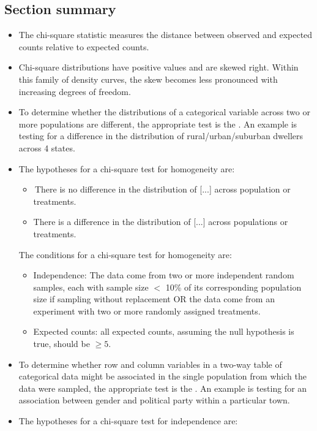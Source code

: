  
\D{\newpage}

\subsection*{Section summary}
\begin{itemize}

\item The chi-square statistic measures the distance between observed and
expected counts relative to expected counts.

\item Chi-square distributions have positive values and are skewed right. Within this
family of density curves, the skew becomes less pronounced with increasing
degrees of freedom.

\item To determine whether the distributions of a categorical variable across two or
more populations are different, the appropriate test is the .  An example is testing for a difference in the distribution of rural/urban/suburban dwellers across 4 states.

\item[]The hypotheses for a chi-square test for
homogeneity are:
\begin{itemize}
\setlength{\itemindent}{3mm}
\item[$H_0$:] \,There is no difference in the distribution of [...] across population or treatments.
\item[$H_A$:]There is a difference in the distribution of [...] across populations or treatments.
\end{itemize}
The conditions for a chi-square test for
homogeneity are:
\begin{itemize}
\item[1.] Independence:  The data come from two or more independent random samples, each with sample size $<$ 10\% of its corresponding population size if sampling without replacement OR the data come from an experiment with two or more randomly assigned treatments.
\item[2.]  Expected counts: all expected counts, assuming the null hypothesis is true, should be \mbox{$\ge 5$.}  
\end{itemize}

\item To determine whether row and column variables in a two-way table of
categorical data might be associated in the single population from which
the data were sampled, the appropriate test is the .  An example is testing for an association between gender and political party within a particular town.
\item[]The hypotheses for a chi-square test for
independence are:


\end{itemize}
